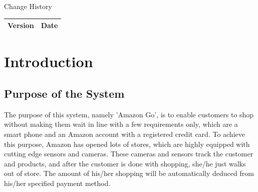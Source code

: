 \documentclass[11pt]{article}
\begin{document}


\newpage

\begin{center}
    \Huge{Change History} 
\end{center}{}
 


\begin{table}[H]
\begin{center}
    

\begin{tabular}{|l|l|}
\hline
\textbf{\Huge{Version}} & \textbf{\Huge{Date}}  \\ \hline
\end{tabular}
\end{center}
\end{table}

\newpage



\begin{flushleft}
    \tableofcontents
\end{flushleft}

\newpage

\begin{flushleft}
    \listoffigures
\end{flushleft}

\newpage

\begin{flushleft}
    \listoftables
\end{flushleft}

\newpage


\section{Introduction}

    \subsection{Purpose of the System}

    The purpose of this system, namely 'Amazon Go', is to enable customers to shop without making them wait in line with a few
    requirements only, which are a smart phone and an Amazon account with a registered credit card. To achieve this purpose, Amazon has opened lots of stores, 
    which are highly equipped with cutting edge sensors and cameras. These cameras and sensors track the customer and products,
    and after the customer is done with shopping, she/he just walks out of store. The amount of his/her shopping will be automatically 
    deduced from his/her specified payment method.
        
\end{document}
